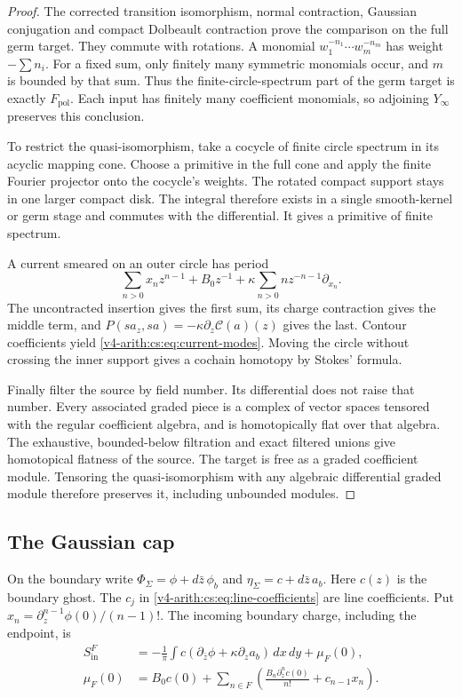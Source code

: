 \begin{proof}
The corrected transition isomorphism, normal contraction, Gaussian
conjugation and compact Dolbeault contraction prove the comparison on the
full germ target. They commute with rotations. A monomial \(w_1^{-n_1}\cdots
w_m^{-n_m}\) has weight \(-\sum n_i\). For a fixed sum, only finitely many
symmetric monomials occur, and \(m\) is bounded by that sum. Thus the
finite-circle-spectrum part of the germ target is exactly
\(F_{\mathrm{pol}}\). Each input has finitely many coefficient monomials, so
adjoining \(Y_\infty\) preserves this conclusion.

To restrict the quasi-isomorphism, take a cocycle of finite circle spectrum
in its acyclic mapping cone. Choose a primitive in the full cone and apply
the finite Fourier projector onto the cocycle's weights. The rotated compact
support stays in one larger compact disk. The integral therefore exists in a
single smooth-kernel or germ stage and commutes with the differential. It
gives a primitive of finite spectrum.

A current smeared on an outer circle has period
\[
 \sum_{n>0}x_nz^{n-1}+B_0z^{-1}
                     +\kappa\sum_{n>0}n z^{-n-1}\partial_{x_n}.
\]
The uncontracted insertion gives the first sum, its charge contraction gives
the middle term, and \(P(sa_z,sa)=-\kappa\partial_z\mathcal C(a)(z)\) gives
the last. Contour coefficients yield \eqref{v4-arith:cs:eq:current-modes}.
Moving the circle without crossing the inner support gives a cochain
homotopy by Stokes' formula.

Finally filter the source by field number. Its differential does not raise
that number. Every associated graded piece is a complex of vector spaces
tensored with the regular coefficient algebra, and is homotopically flat
over that algebra. The exhaustive, bounded-below filtration and exact
filtered unions give homotopical flatness of the source. The target is free
as a graded coefficient module. Tensoring the quasi-isomorphism with any
algebraic differential graded module therefore preserves it, including
unbounded modules.
\end{proof}

\subsection{The Gaussian cap}

On the boundary write \(\Phi_\Sigma=\phi+d\bar z\,\phi_b\) and
\(\eta_\Sigma=c+d\bar z\,a_b\). Here \(c(z)\) is the boundary ghost. The
\(c_j\) in \eqref{v4-arith:cs:eq:line-coefficients} are line coefficients.
Put \(x_n=\partial_z^{n-1}\phi(0)/(n-1)!\). The incoming boundary charge,
including the endpoint, is
\begin{align*}
 S_{\mathrm{in}}^F
  &=-\frac1\pi\int c(\partial_{\bar z}\phi+
                           \kappa\partial_z a_b)\,dx\,dy+\mu_F(0),\\
 \mu_F(0)
  &=B_0c(0)+\sum_{n\in F}
       \left(\frac{B_n\partial_z^nc(0)}{n!}+c_{n-1}x_n\right).
\end{align*}

